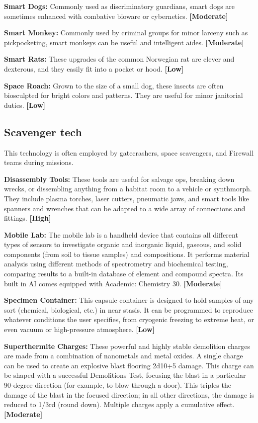 \textbf{Smart Dogs:} Commonly used as discriminatory guardians, smart dogs are sometimes enhanced with combative bioware or cybernetics. \textbf{[Moderate]}

\textbf{Smart Monkey:} Commonly used by criminal groups for minor larceny such as pickpocketing, smart monkeys can be useful and intelligent aides. \textbf{[Moderate]}

\textbf{Smart Rats:} These upgrades of the common Norwegian rat are clever and dexterous, and they easily fit into a pocket or hood. \textbf{[Low]}

\textbf{Space Roach:} Grown to the size of a small dog, these insects are often biosculpted for bright colors and patterns. They are useful for minor janitorial duties. \textbf{[Low]}

\subsection{Scavenger tech}
\label{sec:scavenger-tech}

This technology is often employed by gatecrashers, space scavengers, and Firewall teams during missions.

\textbf{Disassembly Tools:} These tools are useful for salvage ops, breaking down wrecks, or dissembling anything from a habitat room to a vehicle or synthmorph. They include plasma torches, laser cutters, pneumatic jaws, and smart tools like spanners and wrenches that can be adapted to a wide array of connections and fittings. \textbf{[High]}

\textbf{Mobile Lab:} The mobile lab is a handheld device that contains all different types of sensors to investigate organic and inorganic liquid, gaseous, and solid components (from soil to tissue samples) and compositions. It performs material analysis using different methods of spectrometry and biochemical testing, comparing results to a built-in database of element and compound spectra. Its built in AI comes equipped with Academic: Chemistry 30. \textbf{[Moderate]}

\textbf{Specimen Container:} This capsule container is designed to hold samples of any sort (chemical, biological, etc.) in near stasis. It can be programmed to reproduce whatever conditions the user specifies, from cryogenic freezing to extreme heat, or even vacuum or high-pressure atmosphere. \textbf{[Low]}

\textbf{Superthermite Charges:} These powerful and highly stable demolition charges are made from a combination of nanometals and metal oxides. A single charge can be used to create an explosive blast flooring 2d10+5 damage. This charge can be shaped with a successful Demolitions Test, focusing the blast in a particular 90-degree direction (for example, to blow through a door). This triples the damage of the blast in the focused direction; in all other directions, the damage is reduced to 1/3rd (round down). Multiple charges apply a cumulative effect. \textbf{[Moderate]}

